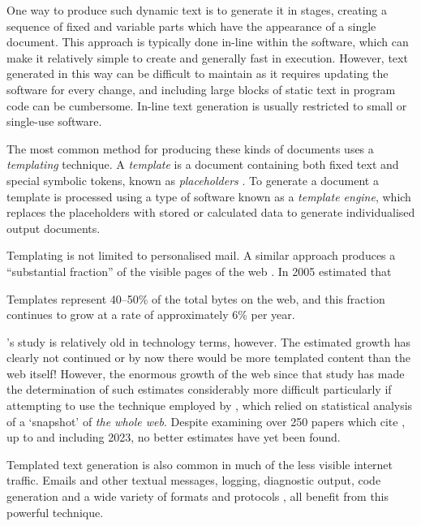 One way to produce such dynamic text is to generate it in stages, creating a sequence of fixed and variable parts which have the appearance of a single document. This approach is typically done in-line within the software, which can make it relatively simple to create and generally fast in execution. However, text generated in this way can be difficult to maintain as it requires updating the software for every change, and including large blocks of static text in program code can be cumbersome. In-line text generation is usually restricted to small or single-use software.

The most common method for producing these kinds of documents uses a \emph{templating} technique. A \emph{template} is a document containing both fixed text and special symbolic tokens, known as \emph{placeholders} \citep{Arnoldus2007}. To generate a document a template is processed using a type of software known as a \emph{template engine}, which replaces the placeholders with stored or calculated data to generate individualised output documents.

Templating is not limited to personalised mail. A similar approach produces a \enquote{substantial fraction} of the visible pages of the web \citep{Yang2008}. In 2005 \citeauthor{Gibson2005} estimated that

\begin{displayquote}
Templates represent 40–50\% of the total bytes on the web, and this fraction continues to grow at a rate of approximately 6\% per year.
\end{displayquote}

\citeauthor{Gibson2005}'s study is relatively old in technology terms, however. The estimated growth has clearly not continued or by now there would be more templated content than the web itself! However, the enormous growth of the web since that study has made the determination of such estimates considerably more difficult particularly if attempting to use the technique employed by \citeauthor{Gibson2005}, which relied on statistical analysis of a `snapshot' of \emph{the whole web}. Despite examining over 250 papers which cite \citeauthor{Gibson2005}, up to and including 2023, no better estimates have yet been found.

Templated text generation is also common in much of the less visible internet traffic. Emails and other textual messages, logging, diagnostic output, code generation \citep{Fritzson2009} \citep{Arnoldus2010} and a wide variety of formats and protocols \citep{Barbosa2002}, all benefit from this powerful technique.

